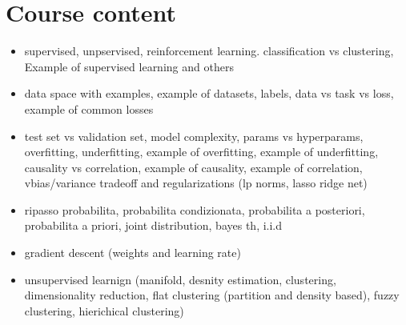\documentclass{article}
\begin{document}
\section{Course content}
\begin{itemize}
    \item supervised, unpservised, reinforcement learning. classification vs clustering, Example of supervised learning and others
    \item data space with examples, example of datasets, labels, data vs task vs loss, example of common losses
    \item test set vs validation set, model complexity, params vs hyperparams, overfitting, underfitting, example of overfitting, example of underfitting, causality vs correlation, example of causality, example of correlation, vbias/variance tradeoff and regularizations (lp norms, lasso ridge net)
    \item ripasso probabilita, probabilita condizionata, probabilita a posteriori, probabilita a priori, joint distribution, bayes th, i.i.d
    \item gradient descent (weights and learning rate)
    \item unsupervised learnign (manifold, desnity estimation, clustering, dimensionality reduction, flat clustering (partition and density based), fuzzy clustering, hierichical clustering)
\end{itemize}
\end{document}
